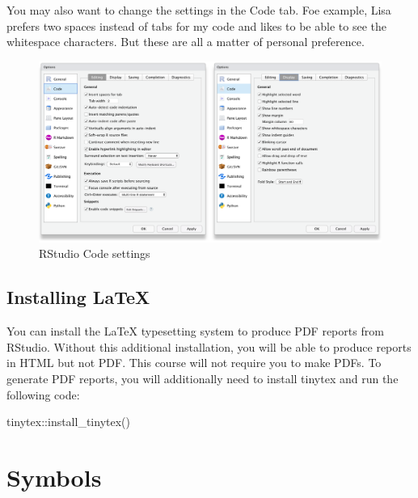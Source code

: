 \documentclass[
  oneside]{book}
\newenvironment{Shaded}{\begin{snugshade}}{\end{snugshade}}
\newcommand{\FunctionTok}[1]{\textcolor[rgb]{0.00,0.00,0.00}{#1}}
\newcommand{\NormalTok}[1]{#1}
\newcommand{\SpecialCharTok}[1]{\textcolor[rgb]{0.00,0.00,0.00}{#1}}
\begin{document}
You may also want to change the settings in the Code tab. Foe example, Lisa prefers two spaces instead of tabs for my code and likes to be able to see the whitespace characters. But these are all a matter of personal preference.

\begin{figure}

{\centering \includegraphics[width=1\linewidth]{images/rstudio_settings_code} 

}

\caption{RStudio Code settings}\label{fig:settings-code}
\end{figure}

\hypertarget{installing-latex}{%
\section{Installing LaTeX}\label{installing-latex}}

You can install the LaTeX typesetting system to produce PDF reports from RStudio. Without this additional installation, you will be able to produce reports in HTML but not PDF. This course will not require you to make PDFs. To generate PDF reports, you will additionally need to install tinytex \citep{R-tinytex} and run the following code:

\begin{Shaded}
\begin{Highlighting}[]
\NormalTok{tinytex}\SpecialCharTok{::}\FunctionTok{install\_tinytex}\NormalTok{()}
\end{Highlighting}
\end{Shaded}

\hypertarget{symbols}{%
\chapter{Symbols}\label{symbols}}
\end{document}
